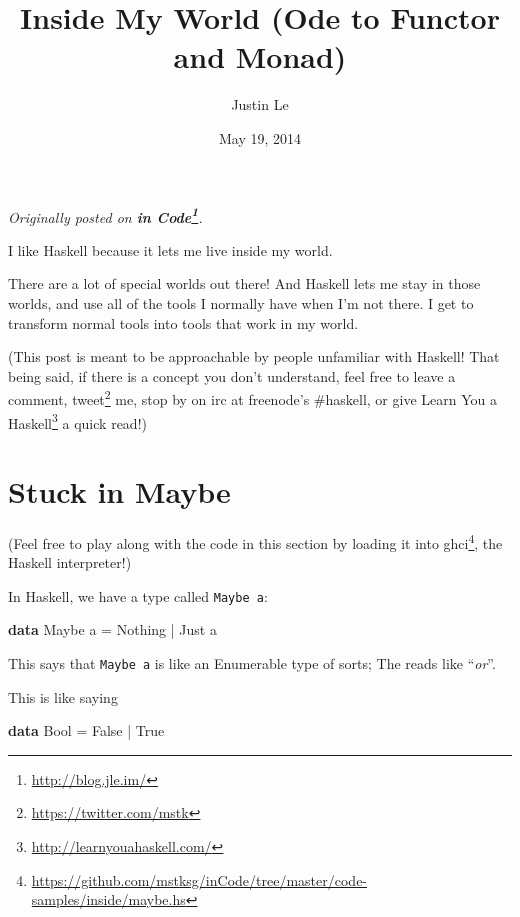\documentclass[]{article}
\title{Inside My World (Ode to Functor and Monad)}
\author{Justin Le}
\date{May 19, 2014}
\newenvironment{Shaded}{}{}
\newcommand{\KeywordTok}[1]{\textcolor[rgb]{0.00,0.44,0.13}{\textbf{{#1}}}}
\newcommand{\DataTypeTok}[1]{\textcolor[rgb]{0.56,0.13,0.00}{{#1}}}
\newcommand{\FunctionTok}[1]{\textcolor[rgb]{0.02,0.16,0.49}{{#1}}}
\newcommand{\NormalTok}[1]{{#1}}
\renewcommand{\href}[2]{#2\footnote{\url{#1}}}
\begin{document}
\maketitle

\emph{Originally posted on \textbf{\href{http://blog.jle.im/}{in
Code}}.}

I like Haskell because it lets me live inside my world.

There are a lot of special worlds out there! And Haskell lets me stay in
those worlds, and use all of the tools I normally have when I'm not
there. I get to transform normal tools into tools that work in my world.

(This post is meant to be approachable by people unfamiliar with
Haskell! That being said, if there is a concept you don't understand,
feel free to leave a comment, \href{https://twitter.com/mstk}{tweet} me,
stop by on irc at freenode's \#haskell, or give
\href{http://learnyouahaskell.com/}{Learn You a Haskell} a quick read!)

\section{Stuck in Maybe}\label{stuck-in-maybe}

(Feel free to play along with the code in this section by
\href{https://github.com/mstksg/inCode/tree/master/code-samples/inside/maybe.hs}{loading
it into ghci}, the Haskell interpreter!)

In Haskell, we have a type called \texttt{Maybe\ a}:

\begin{Shaded}
\begin{Highlighting}[]
\KeywordTok{data} \DataTypeTok{Maybe} \NormalTok{a }\FunctionTok{=} \DataTypeTok{Nothing} \FunctionTok{|} \DataTypeTok{Just} \NormalTok{a}
\end{Highlighting}
\end{Shaded}

This says that \texttt{Maybe\ a} is like an Enumerable type of sorts;
The \texttt{\textbar{}} reads like ``\emph{or}''.

This is like saying

\begin{Shaded}
\begin{Highlighting}[]
\KeywordTok{data} \DataTypeTok{Bool} \FunctionTok{=} \DataTypeTok{False} \FunctionTok{|} \DataTypeTok{True}
\end{Highlighting}
\end{Shaded}
\end{document}
